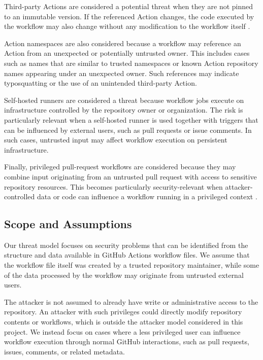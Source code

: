 \documentclass{article}
\begin{document}
Third-party Actions are considered a potential threat when they are not pinned to an immutable version. If the referenced Action changes, the code executed by the workflow may also change without any modification to the workflow itself \cite{githubsecurity,owaspactions}.

Action namespaces are also considered because a workflow may reference an
Action from an unexpected or potentially untrusted owner. This includes cases
such as names that are similar to trusted namespaces or known Action repository
names appearing under an unexpected owner. Such references may indicate
typosquatting or the use of an unintended third-party Action.

Self-hosted runners are considered a threat because workflow jobs execute on
infrastructure controlled by the repository owner or organization. The risk is
particularly relevant when a self-hosted runner is used together with triggers
that can be influenced by external users, such as pull requests or issue
comments. In such cases, untrusted input may affect workflow execution on
persistent infrastructure.

Finally, privileged pull-request workflows are considered because they may combine input originating from an untrusted pull request with access to sensitive repository resources. This becomes particularly security-relevant when attacker-controlled data or code can influence a workflow running in a privileged context \cite{githubprtarget,owaspactions}.

\subsection{Scope and Assumptions}

Our threat model focuses on security problems that can be identified from the structure and data available in GitHub Actions workflow files. We assume that the workflow file itself was created by a trusted repository maintainer, while some of the data processed by the workflow may originate from untrusted external users.

The attacker is not assumed to already have write or administrative access to the repository. An attacker with such privileges could directly modify repository contents or workflows, which is outside the attacker model considered in this project. We instead focus on cases where a less privileged user can influence workflow execution through normal GitHub interactions, such as pull requests, issues, comments, or related metadata.
\end{document}
